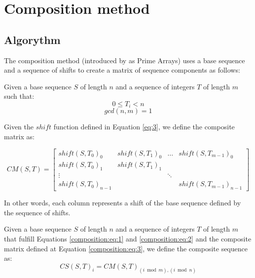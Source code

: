 \section{Composition method}

\subsection{Algorythm}

The composition method (introduced by \citet{tirkel_composition} as Prime
Arrays) uses a base sequence and a sequence of shifts to create a matrix of
sequence components as follows:

\begin{definition}
  Given a base sequence $S$ of length $n$ and a sequence of integers $T$ of
  length $m$ such that:
  \begin{equation}\label{composition:eq:1}
    0 \leq T_{i} < n
  \end{equation}
  \begin{equation}\label{composition:eq:2}
    gcd(n, m) = 1
  \end{equation}

  Given the $shift$ function defined in Equation \ref{eq:3},
  we define the composite matrix as:

  \begin{equation}\label{composition:eq:3}
    CM(S, T) = \begin{bmatrix}
      shift(S, T_{0})_{0} & shift(S, T_{1})_{0} & \dots & shift(S, T_{m-1})_{0} \\
      shift(S, T_{0})_{1} & shift(S, T_{1})_{1} \\
      \vdots & & \ddots \\
      shift(S, T_{0})_{n-1} & & & shift(S, T_{m-1})_{n-1}
    \end{bmatrix}
  \end{equation}

  In other words, each column represents a shift of the base sequence defined
  by the sequence of shifts.
\end{definition}

\begin{definition}
  Given a base sequence $S$ of length $n$ and a sequence of integers $T$ of
  length $m$ that fulfill Equations \ref{composition:eq:1} and
  \ref{composition:eq:2} and the composite matrix defined at Equation
  \ref{composition:eq:3}, we define the composite sequence as:
  \begin{equation}
    CS(S, T)_{i} = CM(S, T)_{(i \bmod m), (i \bmod n)}
  \end{equation}
\end{definition}


